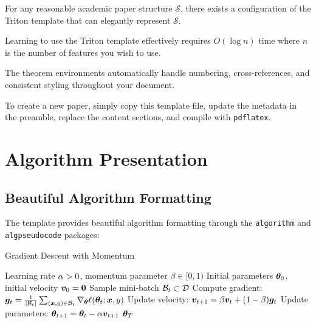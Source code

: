 \documentclass{triton}
\begin{document}
\begin{theorem}
For any reasonable academic paper structure $\mathcal{S}$, there exists a configuration of the Triton template that can elegantly represent $\mathcal{S}$.
\end{theorem}

\begin{lemma}
Learning to use the Triton template effectively requires $O(\log n)$ time where $n$ is the number of features you wish to use.
\end{lemma}

\begin{remark}
The theorem environments automatically handle numbering, cross-references, and consistent styling throughout your document.
\end{remark}

\begin{example}
To create a new paper, simply copy this template file, update the metadata in the preamble, replace the content sections, and compile with \texttt{pdflatex}.
\end{example}

\section{Algorithm Presentation}

\subsection{Beautiful Algorithm Formatting}

The template provides beautiful algorithm formatting through the \texttt{algorithm} and \texttt{algpseudocode} packages:

\begin{algorithm}[htbp]
\caption{Gradient Descent with Momentum}
\label{alg:momentum}
\begin{algorithmic}[1]
  \Require Learning rate $\alpha > 0$, momentum parameter $\beta \in [0,1)$
  \Require Initial parameters ${\bm{\theta}}_0$, initial velocity ${\bm{v}}_0 = {\bm{0}}$
    \State Sample mini-batch $\mathcal{B}_t \subset \mathcal{D}$
    \State Compute gradient: ${\bm{g}}_t = \frac{1}{|\mathcal{B}_t|} \sum_{({\bm{x}},y) \in \mathcal{B}_t} \nabla_{{\bm{\theta}}} \ell({\bm{\theta}}_t; {\bm{x}}, y)$
    \State Update velocity: ${\bm{v}}_{t+1} = \beta {\bm{v}}_t + (1-\beta) {\bm{g}}_t$
    \State Update parameters: ${\bm{\theta}}_{t+1} = {\bm{\theta}}_t - \alpha {\bm{v}}_{t+1}$
  \EndFor
  \State \Return ${\bm{\theta}}_T$
\end{algorithmic}
\end{algorithm}
\end{document}
